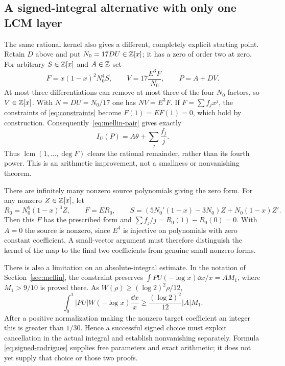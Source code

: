 \subsection{A signed-integral alternative with only one LCM layer}
The same rational kernel also gives a different, completely explicit
starting point. Retain $D$ above and put $N_0=17DU\in\mathbb Z[x]$; it has
a zero of order two at zero. For arbitrary $S\in\mathbb Z[x]$ and $A\in\mathbb Z$ set
\[
 F=x(1-x)^2N_0^4S,\qquad
 V=17\frac{E^3F}{N_0},\qquad P=A+DV.
\]
At most three differentiations can remove at most three of the four
$N_0$ factors, so $V\in\mathbb Z[x]$. With $N=DU=N_0/17$ one has
$NV=E^3F$. If $F=\sum f_jx^j$, the constraints of
\eqref{eq:constraints} become $F(1)=EF(1)=0$, which hold by construction.
Consequently~\eqref{eq:mellin-pair} gives exactly
\begin{equation}\label{eq:signed-rodrigues}
 I_U(P)=A\theta+\sum_j\frac{f_j}{j}.
\end{equation}
Thus $\operatorname{lcm}(1,\ldots,\deg F)$ clears the rational remainder,
rather than its fourth power. This is an arithmetic improvement, not
a smallness or nonvanishing theorem.

There are infinitely many nonzero source polynomials giving the zero
form. For any nonzero $Z\in\mathbb Z[x]$, let
\[
 R_0=N_0^5(1-x)^3Z,\qquad F=ER_0,
 \qquad S=(5N_0'(1-x)-3N_0)Z+N_0(1-x)Z'.
\]
Then this $F$ has the prescribed form and
$\sum f_j/j=R_0(1)-R_0(0)=0$. With $A=0$ the source is nonzero,
since $E^4$ is injective on polynomials with zero constant coefficient.
A small-vector argument must therefore distinguish the kernel of the
map to the final two coefficients from genuine small nonzero forms.

There is also a limitation on an absolute-integral estimate. In the
notation of Section~\ref{sec:mellin}, the constraint preserves
$\int PU(-\log x)\dd x/x=A M_1$, where $M_1>9/10$ is proved there.
As $W(\rho)\geq(\log2)^2\rho/12$,
\[
 \int_0^1|PU|W(-\log x)\frac{\dd x}{x}
       \geq\frac{(\log2)^2}{12}|A|M_1.
\]
After a positive normalization making the nonzero target coefficient
an integer this is greater than $1/30$.
Hence a successful signed choice must exploit cancellation in the
actual integral and establish nonvanishing separately. Formula
\eqref{eq:signed-rodrigues} supplies free parameters and exact arithmetic;
it does not yet supply that choice or those two proofs.
